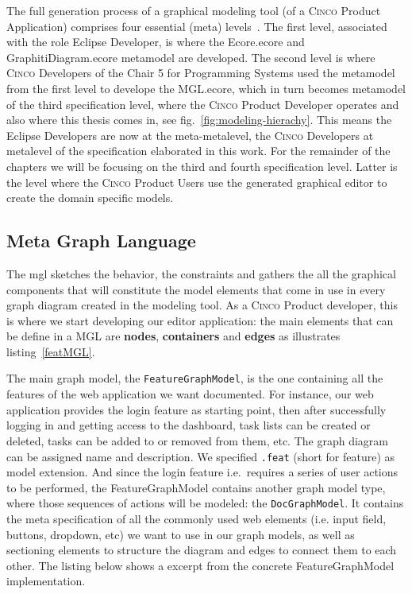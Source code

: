 The full generation process of a graphical modeling tool (of a \textsc{Cinco} Product Application) comprises four essential (meta) levels~\cite{Naujokat2018}. The first level, associated with the role Eclipse Developer, is where the Ecore.ecore and GraphitiDiagram.ecore metamodel are developed. The second level is where \textsc{Cinco} Developers of the Chair 5 for Programming Systems used the metamodel from the first level to develope the MGL.ecore, which in turn becomes metamodel of the third specification level, where the \textsc{Cinco} Product Developer operates and also where this thesis comes in, see fig.~\ref{fig:modeling-hierachy}. This means the Eclipse Developers are now at the meta-metalevel, the \textsc{Cinco} Developers at metalevel of the specification elaborated in this work. For the remainder of the chapters we will be focusing on the third and fourth specification level. Latter is the level where the \textsc{Cinco} Product Users use the generated graphical editor to create the domain specific models.

\subsection{Meta Graph Language}\label{sec:MGL}

The \gls*{mgl} sketches the behavior, the constraints and gathers the all the graphical components that will constitute the model elements that come in use in every graph diagram created in the modeling tool. As a \textsc{Cinco} Product developer, this is where we start developing our editor application: the main elements that can be define in a MGL are \textbf{nodes}, \textbf{containers} and \textbf{edges} as illustrates listing~\ref{featMGL}.

The main graph model, the \lstinline{FeatureGraphModel}, is the one containing all the features of the web application we want documented. For instance, our  web application provides the login feature as starting point, then after successfully logging in and getting access to the dashboard, task lists can be created or deleted, tasks can be added to or removed from them, etc. The graph diagram can be assigned name and description. We specified \lstinline{.feat} (short for feature) as model extension. And since the login feature i.e.~requires a series of user actions to be performed, the FeatureGraphModel contains another graph model type, where those sequences of actions will be modeled: the \lstinline{DocGraphModel}. It contains the meta specification of all the commonly used web elements (i.e. input field, buttons, dropdown, etc) we want to use in our graph models, as well as sectioning elements to structure the diagram and edges to connect them to each other. The listing below shows a excerpt from the concrete FeatureGraphModel implementation.

